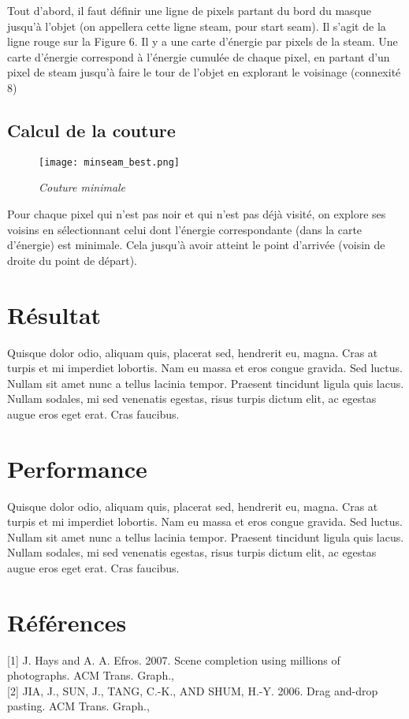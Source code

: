 \documentclass[a4paper]{article}
\begin{document}
Tout d'abord, il faut définir une ligne de pixels partant du bord du masque jusqu'à l’objet (on appellera cette ligne steam, pour start seam). Il s'agit de la ligne rouge sur la Figure 6.
Il y a une carte d’énergie par pixels de la steam.
Une carte d’énergie correspond à l’énergie cumulée de chaque pixel, en partant d’un pixel de steam jusqu’à faire le tour de l’objet en explorant le voisinage (connexité 8)

\subsection{Calcul de la couture}

\begin{figure}[!h]
    	\centering \texttt{[image: minseam\_best.png]}
    	\caption{\it Couture minimale}
\end{figure}
Pour chaque pixel qui n’est pas noir et qui n’est pas déjà visité, on explore ses voisins en sélectionnant celui dont l’énergie correspondante (dans la carte d’énergie) est minimale. Cela jusqu'à avoir atteint le point d'arrivée (voisin de droite du point de départ).

\section{Résultat}

Quisque dolor odio, aliquam quis, placerat sed, hendrerit eu, magna. Cras at
turpis et mi imperdiet lobortis. Nam eu massa et eros congue gravida. Sed
luctus. Nullam sit amet nunc a tellus lacinia tempor. Praesent tincidunt ligula
quis lacus. Nullam sodales, mi sed venenatis egestas, risus turpis dictum elit,
ac egestas augue eros eget erat. Cras faucibus.

\section{Performance}

Quisque dolor odio, aliquam quis, placerat sed, hendrerit eu, magna. Cras at
turpis et mi imperdiet lobortis. Nam eu massa et eros congue gravida. Sed
luctus. Nullam sit amet nunc a tellus lacinia tempor. Praesent tincidunt ligula
quis lacus. Nullam sodales, mi sed venenatis egestas, risus turpis dictum elit,
ac egestas augue eros eget erat. Cras faucibus.

\section{Références}

[1] J. Hays and A. A. Efros.  2007. Scene completion using millions of photographs. ACM Trans. Graph.,
\\

[2] JIA, J., SUN, J., TANG, C.-K., AND SHUM, H.-Y. 2006. Drag and-drop pasting. ACM Trans. Graph.,
\end{document}
